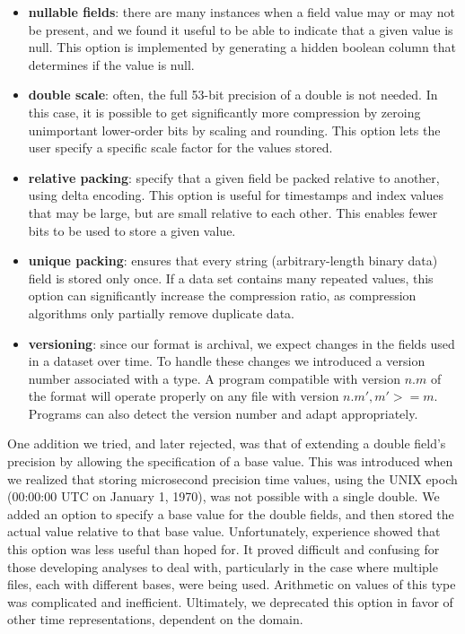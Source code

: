 \documentclass{acm_proc_article-sp}
\begin{document}
\begin{itemize}

\item \textbf{nullable fields}: there are many instances when a field
value may or may not be present, and we found it useful to be able to
indicate that a given value is null. This option is implemented by
generating a hidden boolean column that determines if the value is null.

\item \textbf{double scale}: often, the full 53-bit precision of a double
is not needed. In this case, it is possible to get
significantly more compression by zeroing unimportant 
lower-order bits 
by scaling and rounding. This option lets the user specify
a specific scale factor for the values stored.

\item \textbf{relative packing}: specify that a given field be packed
relative to another, using delta encoding. This option is useful
for timestamps and index values that may be large, but are small
relative to each other. This enables fewer bits to be used to store a
given value.

\item \textbf{unique packing}: ensures that every string 
(arbitrary-length binary data) field is stored only once. If a 
data set
contains many repeated values, this option can significantly increase
the 
compression ratio, as compression algorithms only partially
remove duplicate data.

\item \textbf{versioning}: since our format is archival, we expect
changes in the fields used in a dataset over time.  To handle these
changes we 
introduced a version number associated with a type.
A program compatible with version $n.m$ of the format will operate
properly on any file with version $n.m', m' >= m$.  Programs can also
detect the version number and adapt appropriately.

\end{itemize}

One addition we tried, and later rejected, was that of extending a
double field's
precision by allowing the specification of a base value.
This was introduced when we realized that storing microsecond precision
time values, using the UNIX epoch (00:00:00 UTC on January 1, 1970),
was not possible with a single double. We added an option to
specify a base value for the double fields, and then stored the actual
value relative to that base value.
Unfortunately, experience showed that this option
was less useful than hoped for. It proved difficult and confusing for
those developing analyses to deal with, particularly in the case where
multiple files, each with different bases, were being used. Arithmetic
on values of this type was complicated and inefficient. Ultimately, we
deprecated this option in favor of other time representations,
dependent on the domain. 
\end{document}
